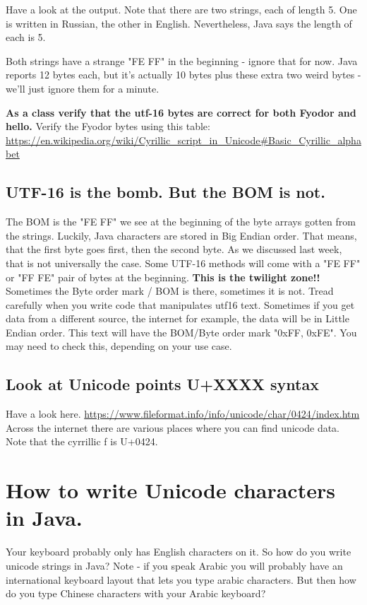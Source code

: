 \documentclass[12pt]{article}
\begin{document}
Have a look at the output. Note that there are two strings, each of length 5. One is written in Russian, the other in English. Nevertheless, Java says the length of each is 5. 

Both strings have a strange "FE FF" in the beginning - ignore that for now. Java reports 12 bytes each, but it's actually 10 bytes plus these extra two weird bytes - we'll just ignore them for a minute.

\begin{center}
\textbf{As a class verify that the utf-16 bytes are correct for both Fyodor and hello.}
Verify the Fyodor bytes using this table:
\url{https://en.wikipedia.org/wiki/Cyrillic_script_in_Unicode#Basic_Cyrillic_alphabet}
\end{center}

\subsection{UTF-16 is the bomb. But the BOM is not.}
The BOM is the "FE FF" we see at the beginning of the byte arrays gotten from the strings. Luckily, Java characters are stored in Big Endian order. That means, that the first byte goes first, then the second byte. As we discussed last week, that is not universally the case. Some UTF-16 methods will come with a "FE FF" or "FF FE" pair of bytes at the beginning. \textbf{This is the twilight zone!!} Sometimes the Byte order mark / BOM is there, sometimes it is not. Tread carefully when you write code that manipulates utf16 text. Sometimes if you get data from a different source, the internet for example, the data will be in Little Endian order. This text will have the BOM/Byte order mark "0xFF, 0xFE". You may need to check this, depending on your use case. 

\subsection{Look at Unicode points U+XXXX syntax}
Have a look here. \url{https://www.fileformat.info/info/unicode/char/0424/index.htm}
Across the internet there are various places where you can find unicode data.
Note that the cyrrillic f is U+0424.

\section{How to write Unicode characters in Java.}

Your keyboard probably only has English characters on it. So how do you write
unicode strings in Java? Note - if you speak Arabic you will probably have an
international keyboard layout that lets you type arabic characters. But then how
do you type Chinese characters with your Arabic keyboard? 
\end{document}
